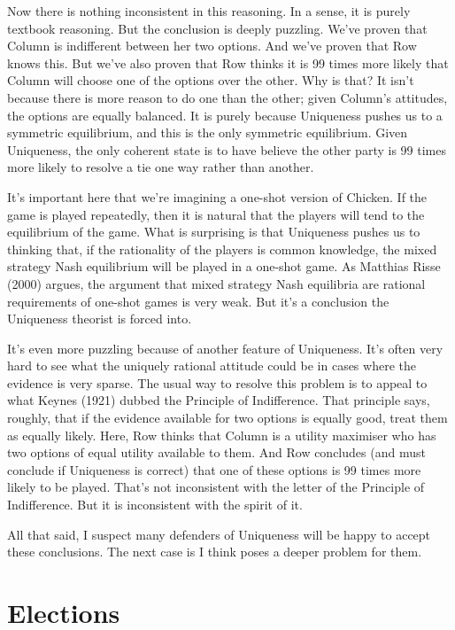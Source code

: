 \documentclass[
  11pt,
]{article}
\begin{document}
Now there is nothing inconsistent in this reasoning. In a sense, it is purely textbook reasoning. But the conclusion is deeply puzzling. We've proven that Column is indifferent between her two options. And we've proven that Row knows this. But we've also proven that Row thinks it is 99 times more likely that Column will choose one of the options over the other. Why is that? It isn't because there is more reason to do one than the other; given Column's attitudes, the options are equally balanced. It is purely because Uniqueness pushes us to a symmetric equilibrium, and this is the only symmetric equilibrium. Given Uniqueness, the only coherent state is to have believe the other party is 99 times more likely to resolve a tie one way rather than another.

It's important here that we're imagining a one-shot version of Chicken. If the game is played repeatedly, then it is natural that the players will tend to the equilibrium of the game. What is surprising is that Uniqueness pushes us to thinking that, if the rationality of the players is common knowledge, the mixed strategy Nash equilibrium will be played in a one-shot game. As Matthias Risse (2000) argues, the argument that mixed strategy Nash equilibria are rational requirements of one-shot games is very weak. But it's a conclusion the Uniqueness theorist is forced into.

It's even more puzzling because of another feature of Uniqueness. It's often very hard to see what the uniquely rational attitude could be in cases where the evidence is very sparse. The usual way to resolve this problem is to appeal to what Keynes (1921) dubbed the Principle of Indifference. That principle says, roughly, that if the evidence available for two options is equally good, treat them as equally likely. Here, Row thinks that Column is a utility maximiser who has two options of equal utility available to them. And Row concludes (and must conclude if Uniqueness is correct) that one of these options is 99 times more likely to be played. That's not inconsistent with the letter of the Principle of Indifference. But it is inconsistent with the spirit of it.

All that said, I suspect many defenders of Uniqueness will be happy to accept these conclusions. The next case is I think poses a deeper problem for them.

\section{Elections}\label{elections}
\end{document}
